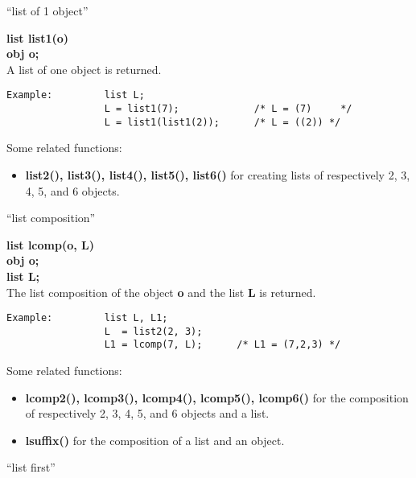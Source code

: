 \leer
\begin{center} ``list of 1 object'' \end{center}
{\bf list list1(o)\\
obj o;}\\[2ex]
A list of one object is returned.

\begin{verbatim}
Example:         list L;
                 L = list1(7);             /* L = (7)     */
                 L = list1(list1(2));      /* L = ((2)) */
\end{verbatim}

Some related functions:

\begin{itemize}
\item[] {\bf list2(), list3(), list4(), list5(), list6()} for creating lists of respectively
2, 3, 4, 5, and 6 objects.
\end{itemize}

\leer
\begin{center} ``list composition'' \end{center}
{\bf list lcomp(o, L)\\   
obj o;\\
list L;}\\[2ex]
The list composition of the object {\bf o} and the list {\bf L} is returned.

\begin{verbatim}
Example:         list L, L1;
                 L  = list2(2, 3);
                 L1 = lcomp(7, L);      /* L1 = (7,2,3) */
\end{verbatim}

Some related functions:

\begin{itemize}
\item[] {\bf lcomp2(), lcomp3(), lcomp4(), lcomp5(), lcomp6()} for the composition of
        respectively 2, 3, 4, 5, and 6 objects and a list.
\item[] {\bf lsuffix()} for the composition of a list and an object.
\end{itemize}

\newpage

\begin{center}
    ``list first'' 
\end{center}

